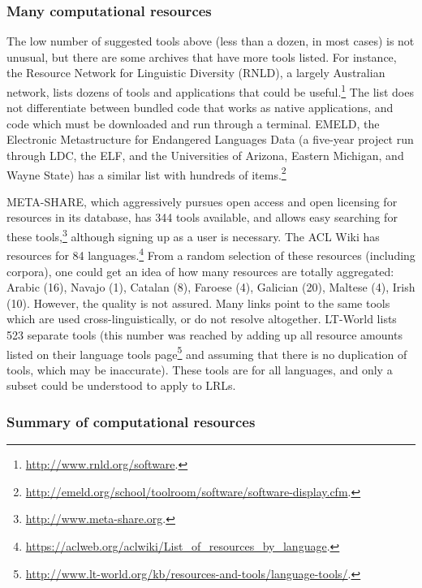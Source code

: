 \subsubsection{Many computational resources}

The low number of suggested tools above (less than a dozen, in most cases) is not unusual, but there are some archives that have more tools listed. For instance, the Resource Network for Linguistic Diversity (RNLD), a largely Australian network, lists dozens of tools and applications that could be useful.\footnote{\href{http://www.rnld.org/software}{http://www.rnld.org/software}. } The list does not differentiate between bundled code that works as native applications, and code which must be downloaded and run through a terminal. EMELD, the Electronic Metastructure for Endangered Languages Data (a five-year project run through LDC, the ELF, and the Universities of Arizona, Eastern Michigan, and Wayne State) has a similar list with hundreds of items.\footnote{\href{http://emeld.org/school/toolroom/software/software-display.cfm}{http://emeld.org/school/toolroom/software/software-display.cfm}. }

META-SHARE, which aggressively pursues open access and open licensing for resources in its database, has 344 tools available, and allows easy searching for these tools,\footnote{\href{http://www.meta-share.org/}{http://www.meta-share.org}. } although signing up as a user is necessary. The ACL Wiki has resources for 84 languages.\footnote{\href{https://aclweb.org/aclwiki/List_of_resources_by_language}{https://aclweb.org/aclwiki/List\_of\_resources\_by\_language}. } From a random selection of these resources (including corpora), one could get an idea of how many resources are totally aggregated: Arabic (16), Navajo (1), Catalan (8), Faroese (4), Galician (20), Maltese (4), Irish (10). However, the quality is not assured. Many links point to the same tools which are used cross-linguistically, or do not resolve altogether. LT-World lists 523 separate tools (this number was reached by adding up all resource amounts listed on their language tools page\footnote{\href{http://www.lt-world.org/kb/resources-and-tools/language-tools/}{http://www.lt-world.org/kb/resources-and-tools/language-tools/}. } and assuming that there is no duplication of tools, which may be inaccurate). These tools are for all languages, and only a subset could be understood to apply to LRLs.

\subsubsection{Summary of computational resources}

